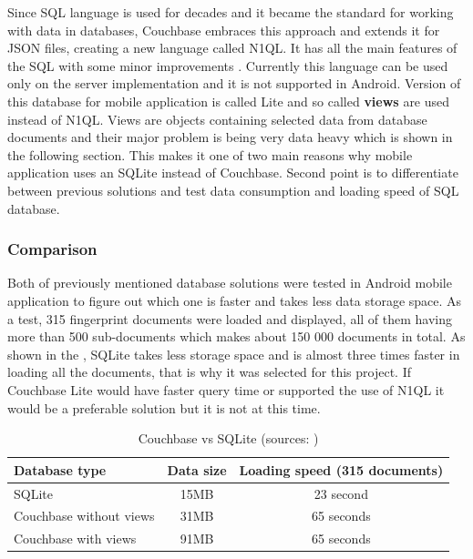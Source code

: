 Since SQL language is used for decades and it became the standard for working with data in databases, Couchbase embraces this approach and extends it for JSON files, creating a new language called N1QL. It has all the main features of the SQL with some minor improvements \cite{WINQL}. Currently this language can be used only on the server implementation and it is not supported in Android. Version of this database for mobile application is called Lite and so called \textbf{views} are used instead of N1QL. Views are objects containing selected data from database documents and their major problem is being very data heavy which is shown in the following section. This makes it one of two main reasons why mobile application uses an SQLite instead of Couchbase. Second point is to differentiate between previous solutions and test data consumption and loading speed of SQL database.

\subsubsection{Comparison}\label{subsubsec:Comparison}
Both of previously mentioned database solutions were tested in Android mobile application to figure out which one is faster and takes less data storage space. As a test, 315 fingerprint documents were loaded and displayed, all of them having more than 500 sub-documents which makes about 150 000 documents in total. As shown in the , SQLite takes less storage space and is almost three times faster in loading all the documents, that is why it was selected for this project. If Couchbase Lite would have faster query time or supported the use of N1QL it would be a preferable solution but it is not at this time.

\vspace*{6pt}
\begin{table}[h]
	\begin{center}
		\scriptsize
		\begin{tabular}{| l | c | c |}
			\hline
			Database type & Data size & Loading speed (315 documents) \\ \hline
			SQLite & 15MB & 23 second \\ \hline
			Couchbase without views & 31MB & 65 seconds \\ \hline
			Couchbase with views & 91MB & 65 seconds \\ \hline
		\end{tabular}
		\caption{Couchbase vs SQLite (sources: \cite{LGWSP, LGWST, HW2, PM600, AZW3})}
		\label{tab3}
	\end{center}
\end{table}
\vspace*{-\baselineskip}
\vspace*{6pt}

